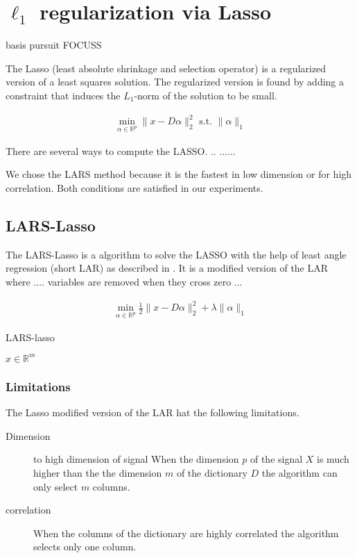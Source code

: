 \section {$\ell_1$ regularization via Lasso}

basis pursuit\cite{} 
FOCUSS \cite{}

The Lasso (least absolute shrinkage and selection operator) is a regularized version of a least squares solution.
The regularized version is found by adding a constraint that induces the $L_1$-norm of the solution to be small. \cite{Tibshirani1998}

\begin{align}
\min_{\alpha\in\mathbb{R}^{p}} \lVert x - D\alpha \rVert^{2}_{2}  \text{ s.t. } \lVert \alpha \rVert_{1}
\end{align}

There are several ways to compute the LASSO. .. ...... \cite{} 

We chose the LARS method because it is the fastest in low dimension or for high correlation. Both conditions are satisfied in our experiments.
\subsection {LARS-Lasso}
\label{sec:lars}
The LARS-Lasso is a algorithm to solve the LASSO with the help of least angle regression (short LAR)
as described in \cite{Efron2004}. It is a modified version of the LAR where .... variables are removed when they cross zero ...


\begin{align}
\min_{\alpha\in\mathbb{R}^{p}}  \frac{1}{2} \lVert x - D\alpha \rVert^{2}_{2} + \lambda \lVert \alpha \rVert_{1}
\end{align}

\begin{algorithm}
\caption{LARS-lasso}
\begin{algorithmic}[1]
\REQUIRE $x \in \mathbb{R}^m$
\end{algorithmic}
\end{algorithm}

\subsubsection{Limitations}
The Lasso modified version of the LAR hat the following limitations.
\begin{description}
 \item[Dimension] to high dimension of signal When the dimension $p$ of the signal $X$ is 
much higher than the the dimension $m$ of the dictionary $D$ the algorithm can only select $m$ columns.

\item[correlation] When the columns of the dictionary are highly correlated the algorithm
selects only one column.
\end{description}

